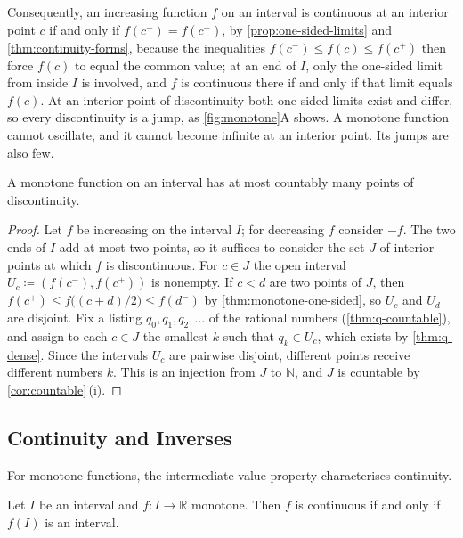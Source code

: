 Consequently, an increasing function $f$ on an interval is continuous at an interior point $c$ if and only if $f(c^-)=f(c^+)$, by \cref{prop:one-sided-limits} and \cref{thm:continuity-forms}, because the inequalities $f(c^-)\le f(c)\le f(c^+)$ then force $f(c)$ to equal the common value; at an end of $I$, only the one-sided limit from inside $I$ is involved, and $f$ is continuous there if and only if that limit equals $f(c)$. At an interior point of discontinuity both one-sided limits exist and differ, so every discontinuity is a jump, as \cref{fig:monotone}A shows. A monotone function cannot oscillate, and it cannot become infinite at an interior point. Its jumps are also few.

\begin{proposition}
\label{prop:monotone-countable}
A monotone function on an interval has at most countably many points of discontinuity.
\end{proposition}

\begin{proof}
Let $f$ be increasing on the interval $I$; for decreasing $f$ consider $-f$. The two ends of $I$ add at most two points, so it suffices to consider the set $J$ of interior points at which $f$ is discontinuous. For $c\in J$ the open interval $U_c\coloneqq(f(c^-),f(c^+))$ is nonempty. If $c<d$ are two points of $J$, then $f(c^+)\le f\bigl((c+d)/2\bigr)\le f(d^-)$ by \cref{thm:monotone-one-sided}, so $U_c$ and $U_d$ are disjoint. Fix a listing $q_0,q_1,q_2,\ldots$ of the rational numbers (\cref{thm:q-countable}), and assign to each $c\in J$ the smallest $k$ such that $q_k\in U_c$, which exists by \cref{thm:q-dense}. Since the intervals $U_c$ are pairwise disjoint, different points receive different numbers $k$. This is an injection from $J$ to $\mathbb N$, and $J$ is countable by \cref{cor:countable}\,(i).
\end{proof}

\subsection{Continuity and Inverses}

For monotone functions, the intermediate value property characterises continuity.

\begin{theorem}
\label{thm:monotone-continuity}
Let $I$ be an interval and $f\colon I\to\mathbb R$ monotone. Then $f$ is continuous if and only if $f(I)$ is an interval.
\end{theorem}

